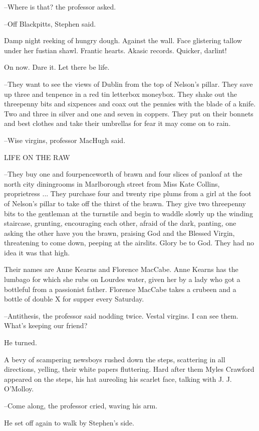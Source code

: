 --Where is that? the professor asked.

--Off Blackpitts, Stephen said.

Damp night reeking of hungry dough. Against the wall. Face
glistering tallow under her fustian shawl. Frantic hearts. Akasic records.
Quicker, darlint!

On now. Dare it. Let there be life.

--They want to see the views of Dublin from the top of Nelson's pillar.
They save up three and tenpence in a red tin letterbox moneybox. They
shake out the threepenny bits and sixpences and coax out the pennies with
the blade of a knife. Two and three in silver and one and seven in
coppers. They put on their bonnets and best clothes and take their
umbrellas for fear it may come on to rain.

--Wise virgins, professor MacHugh said.


    LIFE ON THE RAW


--They buy one and fourpenceworth of brawn and four slices of panloaf at
the north city diningrooms in Marlborough street from Miss Kate Collins,
proprietress ... They purchase four and twenty ripe plums from a girl at
the foot of Nelson's pillar to take off the thirst of the brawn. They give
two threepenny bits to the gentleman at the turnstile and begin to waddle
slowly up the winding staircase, grunting, encouraging each other, afraid
of the dark, panting, one asking the other have you the brawn, praising
God and the Blessed Virgin, threatening to come down, peeping at the
airslits. Glory be to God. They had no idea it was that high.

Their names are Anne Kearns and Florence MacCabe. Anne Kearns
has the lumbago for which she rubs on Lourdes water, given her by a lady
who got a bottleful from a passionist father. Florence MacCabe takes a
crubeen and a bottle of double X for supper every Saturday.

--Antithesis, the professor said nodding twice. Vestal virgins. I can see
them. What's keeping our friend?

He turned.

A bevy of scampering newsboys rushed down the steps, scattering in
all directions, yelling, their white papers fluttering. Hard after them
Myles Crawford appeared on the steps, his hat aureoling his scarlet face,
talking with J. J. O'Molloy.

--Come along, the professor cried, waving his arm.

He set off again to walk by Stephen's side.


